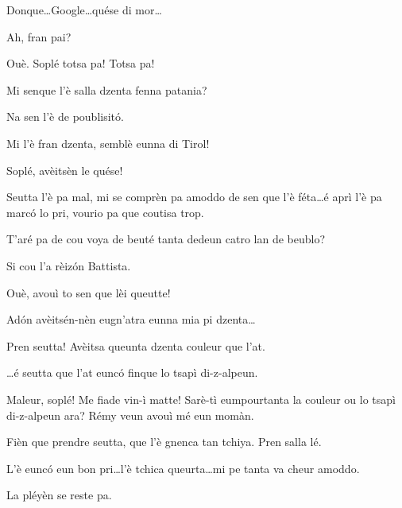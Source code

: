 \begin{drama}
\Remyspeaks{} Donque\ldots Google\ldots quése di mor\ldots

\Cesarspeaks{} Ah, fran pai?

\Remyspeaks Ouè.  Soplé totsa pa! Totsa pa!

\Hermannspeaks Mi senque l'è salla dzenta fenna patania?

\Remyspeaks Na sen l'è de poublisit\'o.

\Hermannspeaks Mi l'è fran dzenta, semblè eunna di Tirol!

\Remyspeaks Soplé, avèitsèn le quése!

\Cesarspeaks Seutta l'è pa mal, mi se comprèn pa amoddo de sen que l'è féta\ldots é aprì l'è pa marc\'o lo pri, vourio pa que coutisa trop.

\Battistaspeaks{}  T’aré pa de cou voya de beuté tanta dedeun catro lan de beublo?

\Hermannspeaks Si cou l’a rèiz\'on Battista.

\Battistaspeaks Ouè, avouì to sen que lèi queutte!


\Cesarspeaks Ad\'on avèitsén-nèn eugn'atra eunna mia pi dzenta\ldots


\Hermannspeaks Pren seutta! Avèitsa queunta dzenta couleur que l'at.

\Battistaspeaks \ldots é seutta que l’at eunc\'o finque lo tsapì di-z-alpeun.

\Cesarspeaks{} Maleur, soplé! Me fiade vin-ì matte! Sarè-tì eumpourtanta la couleur ou lo tsapì di-z-alpeun ara? Rémy veun avouì mé eun momàn.


\Cesarspeaks{} Fièn que prendre seutta, que l'è gnenca tan tchiya. Pren salla lé.

\Remyspeaks  L'è eunc\'o eun bon pri\ldots l'è tchica queurta\ldots mi pe tanta va cheur amoddo.

\Battistaspeaks  La pléyèn se reste pa.



\end{drama}
